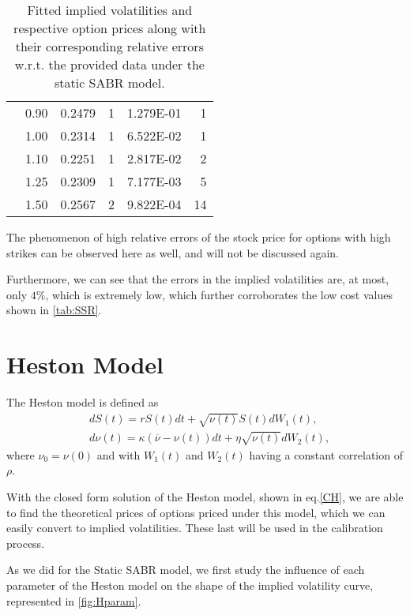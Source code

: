 \begin{table}[H]
\begin{tabular}{@{}cccrcr@{}}
 & 0.90 & 0.2479 & 1 & \num{1.279E-01} & 1 \\
 & 1.00 & 0.2314 & 1 & \num{6.522E-02} & 1 \\
 & 1.10 & 0.2251 & 1 & \num{2.817E-02} & 2 \\
 & 1.25 & 0.2309 & 1 & \num{7.177E-03} & 5 \\
 & 1.50 & 0.2567 & 2 & \num{9.822E-04} & 14 \\ \bottomrule
\end{tabular}
  \caption[Fitted implied volatilities and respective option prices along with their corresponding relative errors w.r.t. the provided data under the static SABR model.]{Fitted implied volatilities and respective option prices along with their corresponding relative errors w.r.t. the provided data under the static SABR model.}
  \label{tab:SS}
\end{table}

The phenomenon of high relative errors of the stock price for options with high strikes can be observed here as well, and will not be discussed again.

Furthermore, we can see that the errors in the implied volatilities are, at most, only $4\%$, which is extremely low, which further corroborates the low cost values shown in \autoref{tab:SSR}.

\vfill
\newpage

\section{Heston Model}
The Heston model is defined as
\begin{subequations}
\begin{align}
&dS(t)=rS(t)dt+\sqrt{\nu(t)}S(t)dW_1(t),\\
&d\nu(t)=\kappa(\overline{\nu}-\nu(t))dt+\eta\sqrt{\nu(t)}dW_2(t),
\end{align}
\end{subequations}
\noindent where $\nu_0=\nu(0)$ and with $W_1(t)$ and $W_2(t)$ having a constant correlation of $\rho$.

With the closed form solution of the Heston model, shown in eq.\eqref{CH}, we are able to find the theoretical prices of options priced under this model, which we can easily convert to implied volatilities. These last will be used in the calibration process.

As we did for the Static SABR model, we first study the influence of each parameter of the Heston model on the shape of the implied volatility curve, represented in \autoref{fig:Hparam}.

